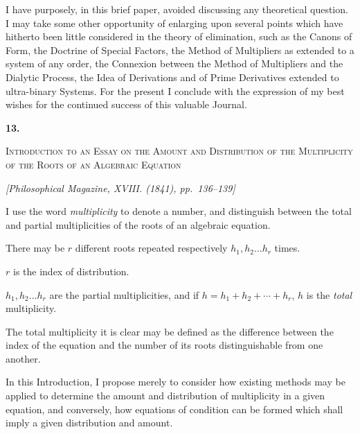\documentclass[11pt]{article}
\newcommand{\paperhead}[3]{%
  \clearpage
  \begin{center}
  {\Large\bfseries #1.}\par\vspace{0.85em}
  {\large\scshape #2}\par\vspace{0.6em}
  {\itshape [#3]}\par
  \end{center}\vspace{0.4em}}
\newcommand{\sourcepage}[1]{\marginpar{\scriptsize p.~#1}}
\begin{document}
I have purposely, in this brief paper, avoided discussing any theoretical question. I may take some other opportunity of enlarging upon several points which have hitherto been little considered in the theory of elimination, such as the Canons of Form, the Doctrine of Special Factors, the Method of Multipliers as extended to a system of any order, the Connexion between the Method of Multipliers and the Dialytic Process, the Idea of Derivations and of Prime Derivatives extended to ultra-binary Systems. For the present I conclude with the expression of my best wishes for the continued success of this valuable Journal.


\paperhead{13}{Introduction to an Essay on the Amount and Distribution of the Multiplicity of the Roots of an Algebraic Equation}{Philosophical Magazine, XVIII. (1841), pp.~136--139}

\sourcepage{66}
I use the word \emph{multiplicity} to denote a number, and distinguish between the total and partial multiplicities of the roots of an algebraic equation.

There may be $r$ different roots repeated respectively $h_1,h_2\ldots h_r$ times.

$r$ is the index of distribution.

$h_1,h_2\ldots h_r$ are the partial multiplicities, and if $h=h_1+h_2+\cdots+h_r$, $h$ is the \emph{total} multiplicity.

The total multiplicity it is clear may be defined as the difference between the index of the equation and the number of its roots distinguishable from one another.

In this Introduction, I propose merely to consider how existing methods may be applied to determine the amount and distribution of multiplicity in a given equation, and conversely, how equations of condition can be formed which shall imply a given distribution and amount.
\end{document}
